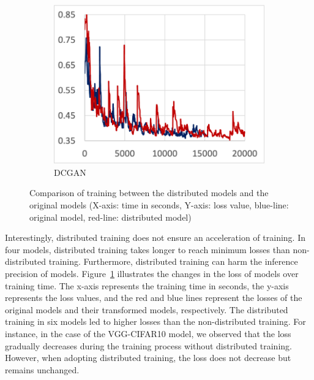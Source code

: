 \begin{figure}
\begin{subfigure}[t]{.24\textwidth}
    \includegraphics[width=\textwidth]{tf2-13}
    \caption{DCGAN}
  \end{subfigure} 

  \caption{Comparison of training between the distributed models and the
  original models (X-axis: time in seconds, Y-axis: loss value, blue-line:
  original model, red-line: distributed model)}
  \label{fig:eval:train}
\end{figure}

Interestingly, distributed training does not ensure an acceleration of
training.
In four models, distributed training takes longer to reach
minimum losses than non-distributed training.
Furthermore, distributed training can harm the inference precision of models.
Figure~\ref{fig:eval:train} illustrates the changes in the loss of models over
training time. 
The x-axis represents the training time in seconds, the y-axis represents the
loss values, and the red and blue lines represent the losses of the
original models and their transformed models, respectively.
The distributed training in six models led to higher losses than
the non-distributed training.
For instance, in the case of the VGG-CIFAR10 model, we observed that the loss
gradually decreases during the training process without distributed training.
However, when adopting distributed training, the loss does not decrease but
remains unchanged.

